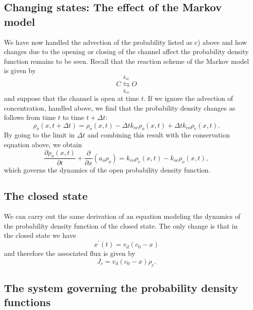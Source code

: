 \bigskip

\subsection{Changing states: The effect of the Markov model}

We have now handled the advection of the probability listed as c) above and 
how changes due to the opening or closing of the channel affect
the probability density function remains to be seen. Recall that the reaction scheme of the
Markov model is given by
\begin{equation}
C\underset{k_{co}}{\overset{k_{oc}}{\leftrightarrows}}O
\end{equation}
and suppose that the channel is open at time $t$. If we ignore the advection
of concentration, handled above, we find that the probability density changes
as follows from time $t$ to time $t+\Delta t:$
\[
\rho_{o}(x,t+\Delta t)=\rho_{o}(x,t)-\Delta tk_{oc}\rho_{o}(x,t)+\Delta
tk_{co}\rho_{c}(x,t).
\]
By going to the limit in $\Delta t$ and combining this result with the
conservation equation above, we obtain
\[
\frac{\partial\rho_{o}\left(  x,t\right)  }{\partial t}+\frac{\partial
}{\partial x}(a_o  \rho_{o})=k_{co}
\rho_{c}(x,t)-k_{oc}\rho_{o}(x,t),
\]
which governs the dynamics of the open probability density function.

\subsection{The closed state}

We can carry out the same derivation of an equation modeling the dynamics of the
probability density function of the closed state. The only change is that in the
closed state we have
\[
x^{\prime}(t)=v_{d}(c_{0}-x)
\]
and therefore the associated flux is given by
\begin{equation}
J_{c}=v_{d}(c_{0}-x)\rho_{c}.
\end{equation}


\subsection{The system governing the probability density
functions \label{system_def_99}}

